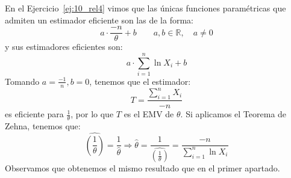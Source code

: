 \begin{ejercicio}
\begin{enumerate}[label=\alph*)]
            En el Ejercicio~\ref{ej:10_rel4} vimos que las únicas funciones paramétricas que admiten un estimador eficiente son las de la forma:
            \begin{equation*}
                a\cdot \frac{-n}{\theta} +b\qquad a,b\in \mathbb{R}, \quad a\neq 0
            \end{equation*}
            y sus estimadores eficientes son:
            \begin{equation*}
                a\cdot \sum_{i=1}^{n}\ln X_i + b
            \end{equation*}
            Tomando $a=\frac{-1}{n},b=0$, tenemos que el estimador:
            \begin{equation*}
                T = \frac{\sum\limits_{i=1}^{n}X_i}{-n}
            \end{equation*}
            es eficiente para $\frac{1}{\theta}$, por lo que $T$ es el EMV de $\theta$. Si aplicamos el Teorema de Zehna, tenemos que:
            \begin{equation*}
                \widehat{\left(\frac{1}{\theta}\right)} = \frac{1}{\hat{\theta}} \Longrightarrow \hat{\theta} = \frac{1}{\widehat{\left(\frac{1}{\theta}\right)} } = \frac{-n}{\sum\limits_{i=1}^{n}\ln X_i}
            \end{equation*}
            Observamos que obtenemos el mismo resultado que en el primer apartado.
    \end{enumerate}
\end{ejercicio}


